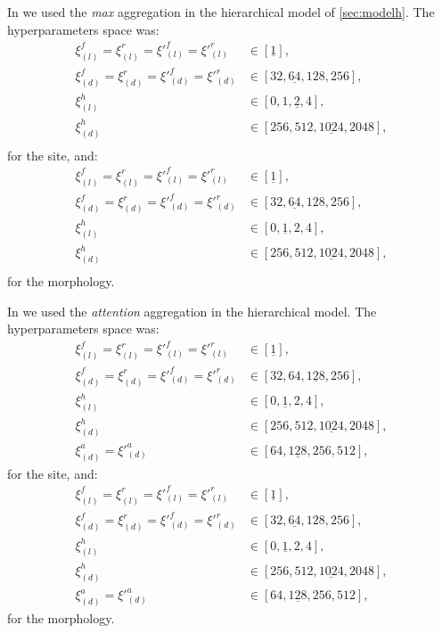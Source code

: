 In \maxh{} we used the \emph{max} aggregation in the hierarchical
model of \cref{sec:modelh}. The hyperparameters space was:
\begin{align*}
  \xi_{(l)}^f=\xi_{(l)}^r=\xi'^f_{(l)}=\xi'^r_{(l)}&\in[\underline{1}],\\
  \xi_{(d)}^f=\xi_{(d)}^r=\xi'^f_{(d)}=\xi'^r_{(d)}&\in[32,\underline{64},128,256],\\
  \xi_{(l)}^h&\in[0,1,\underline{2},4],\\
  \xi_{(d)}^h&\in[256,512,\underline{1024},2048],\\
\end{align*}
for the site, and:
\begin{align*}
  \xi_{(l)}^f=\xi_{(l)}^r=\xi'^f_{(l)}=\xi'^r_{(l)}&\in[\underline{1}],\\
  \xi_{(d)}^f=\xi_{(d)}^r=\xi'^f_{(d)}=\xi'^r_{(d)}&\in[32,\underline{64},128,256],\\
  \xi_{(l)}^h&\in[0,\underline{1},2,4],\\
  \xi_{(d)}^h&\in[256,512,\underline{1024},2048],\\
\end{align*}
for the morphology.

In \softmaxh{} we used the \emph{attention} aggregation in the
hierarchical model. The hyperparameters space was:
\begin{align*}
  \xi_{(l)}^f=\xi_{(l)}^r=\xi'^f_{(l)}=\xi'^r_{(l)}&\in[\underline{1}],\\
  \xi_{(d)}^f=\xi_{(d)}^r=\xi'^f_{(d)}=\xi'^r_{(d)}&\in[32,64,\underline{128},256],\\
  \xi_{(l)}^h&\in[0,\underline{1},2,4],\\
  \xi_{(d)}^h&\in[256,512,\underline{1024},2048],\\
  \xi_{(d)}^a=\xi'^a_{(d)}&\in[64,\underline{128},256,512],
\end{align*}
for the site, and:
\begin{align*}
  \xi_{(l)}^f=\xi_{(l)}^r=\xi'^f_{(l)}=\xi'^r_{(l)}&\in[\underline{1}],\\
  \xi_{(d)}^f=\xi_{(d)}^r=\xi'^f_{(d)}=\xi'^r_{(d)}&\in[32,\underline{64},128,256],\\
  \xi_{(l)}^h&\in[0,\underline{1},2,4],\\
  \xi_{(d)}^h&\in[256,512,\underline{1024},2048],\\
  \xi_{(d)}^a=\xi'^a_{(d)}&\in[64,\underline{128},256,512],
\end{align*}
for the morphology.

